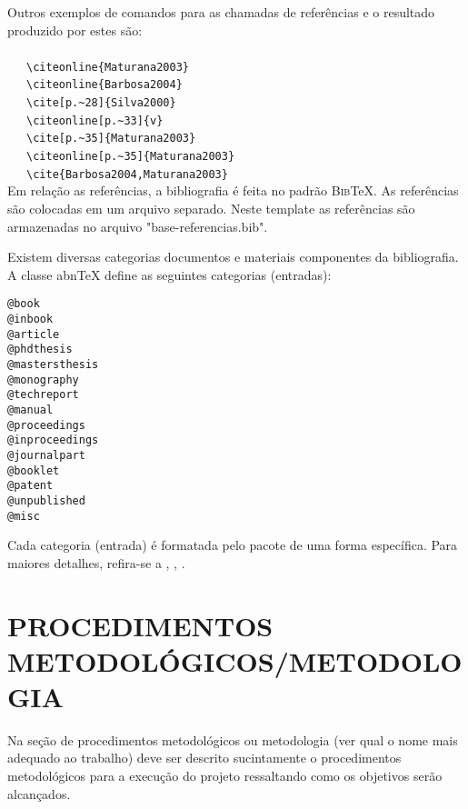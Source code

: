 Outros exemplos de comandos para as chamadas de referências e o resultado produzido por estes são:\\
\\ \ \ \  \verb|\citeonline{Maturana2003}|\\
 \ \ \   \verb|\citeonline{Barbosa2004}|\\
\cite[p.~28]{Silva2000} \ \ \  \verb|\cite[p.~28]{Silva2000}|\\
 \ \ \   \verb|\citeonline[p.~33]{v}|\\
\cite[p.~35]{Maturana2003} \ \ \   \verb|\cite[p.~35]{Maturana2003}|\\
 \ \ \   \verb|\citeonline[p.~35]{Maturana2003}|\\
\cite{Barbosa2004,Maturana2003} \ \ \   \verb|\cite{Barbosa2004,Maturana2003}|\\

Em relação as referências, a bibliografia é feita no padrão \textsc{Bib}\TeX{}. As referências são colocadas em um arquivo separado. Neste template as referências são armazenadas no arquivo "base-referencias.bib".

Existem diversas categorias documentos e materiais componentes da bibliografia. A classe abn\TeX{} define as seguintes categorias (entradas):

\begin{verbatim}
@book
@inbook
@article
@phdthesis
@mastersthesis
@monography
@techreport
@manual
@proceedings
@inproceedings
@journalpart
@booklet
@patent
@unpublished
@misc
\end{verbatim}

Cada categoria (entrada) é formatada pelo pacote  de uma forma específica. Para maiores detalhes, refira-se a , , .

\section{PROCEDIMENTOS METODOLÓGICOS/METODOLOGIA} %
\label{sec:metodologia}
Na seção de procedimentos metodológicos ou metodologia (ver qual o nome mais adequado ao trabalho) deve ser descrito sucintamente o procedimentos metodológicos para a execução do projeto ressaltando como os objetivos serão alcançados. 

